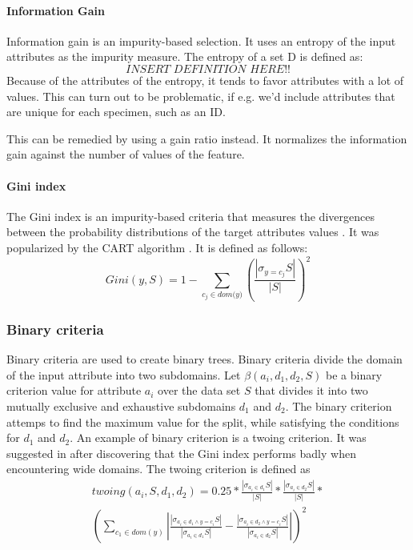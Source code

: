\documentclass[thesis=B,english]{FITthesis}[2012/10/20]
\begin{document}
				\paragraph*{Information Gain}
				Information gain is an  impurity-based selection. It uses an entropy of the input attributes as the impurity measure. The entropy of a set D is defined as:
				\[
				\textit{INSERT DEFINITION HERE!!}
				\] 
				Because of the attributes of the entropy, it tends to favor attributes with a lot of values. This can turn out to be problematic, if e.g. we'd include attributes that are unique for each specimen, such as an ID. \cite{ENSEMBLE}
				
				This can be remedied by using a gain ratio instead. It normalizes the information gain against the number of values of the feature.
				\paragraph*{Gini index}
				The Gini index is an impurity-based criteria that measures the divergences between the probability distributions of the target attributes values \cite{DMWithDecisionTrees}. It was popularized by the CART algorithm \cite{CART}. It is defined as follows:
				\[
					\textit{Gini}\left(y, S\right)=1 - \sum _{c_j \in \textit{dom(y)}}\left(\frac{|\sigma_{y=c_j}S|}{|S|}\right)^2
				\]
				\subsubsection{Binary criteria}
				Binary criteria are used to create binary trees. Binary criteria divide the domain of the input attribute into two subdomains. Let \(\beta(a_i, d_1, d_2, S)\) be a binary criterion value for attribute \(a_i\) over the data set \(S\) that divides it into two mutually exclusive and exhaustive subdomains \(d_1\) and \(d_2\). The binary criterion attemps to find the maximum value for the split, while satisfying the conditions for \(d_1\) and \(d_2\). An example of binary criterion is a twoing criterion. It was suggested in \cite{CART} after discovering that the Gini index performs badly when encountering wide domains. The twoing criterion is defined as
				\begin{multline}
					\textit{twoing}(a_i, S, d_1, d_2) = 0.25 * \frac{|\sigma_{a_{i} \in d_1}S|}{|S|}* \frac{|\sigma_{a_{i} \in d_2}S|}{|S|}  * \\ \left(\sum_{c_{1}\in\textit{dom}(y)}{
					\left|
					\frac{\left|
							\sigma_{a_{i}\in d_{1} \wedge y=c_i}S
						\right|}
						{|\sigma_{a_{i} \in d_1}S|} - \frac{\left|
							\sigma_{a_{i}\in d_{2} \wedge y=c_i}S
						\right|}
						{|\sigma_{a_{i} \in d_2}S|}
					\right|
					}\right)^2
				\end{multline}
\end{document}
